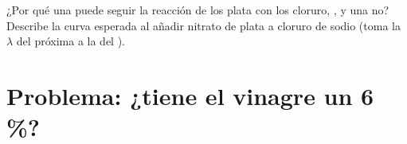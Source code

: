 \begin{exercise}[$\star\star\star$]\label{exo:g12:ph-conductivity-titrations:15}
¿Por qué una  puede seguir la reacción de los
 plata con los  cloruro, , y una
 no? Describe la curva esperada al añadir nitrato
de plata a cloruro de sodio (toma la $\lambda$ del  próxima a la
del ).
\end{exercise}

\section{Problema: ¿tiene el vinagre un 6\,\%?}

